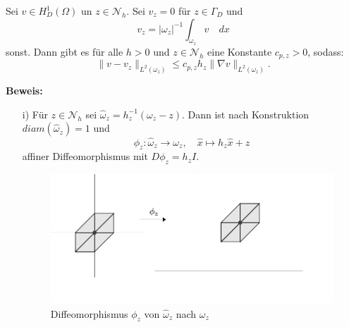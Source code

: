 \begin{lemma}
	Sei $v \in H^1_D(\Omega)$ un $z\in \mathscr{N}_h.$ Sei $v_z= 0$ für $z\in \Gamma_D$ und 
	\[ v_z = |\omega_z|^{-1} \int_{\omega_z} v \quad dx
	\]
	sonst. Dann gibt es für alle $h > 0$ und $z \in \mathscr{N}_h$ eine Konstante $c_{p,z}>0$, sodass:
	\[
	\|v-v_z\|_{L^2(\omega_z)}\leq c_{p,z}h_z\|\nabla v\|_{L^2(\omega_z)}.
	\]
\end{lemma}
\textbf{Beweis:}
\begin{itemize}
	\item[i)] 
	Für $z\in \mathscr{N}_h$ sei $\widehat{\omega}_z = h_z^{-1}(\omega_z - z)$. Dann ist nach Konstruktion $diam(\widehat{\omega}_z) = 1$ und
	\[
	\phi_z : \widehat{\omega}_z \rightarrow \omega_z, \quad \hat{x} \mapsto h_z\hat{x}+z
	\]
	affiner Diffeomorphismus mit $D\phi_z = h_zI$.
	
	\begin{figure}[!htbp]
		\begin{center}
			\includegraphics[width=15cm]{pics/omega.png}
		\end{center}
		\caption{Diffeomorphismus $\phi_z$ von $\widehat{\omega}_z$ nach $\omega_z$}
	\end{figure}


\end{itemize}
